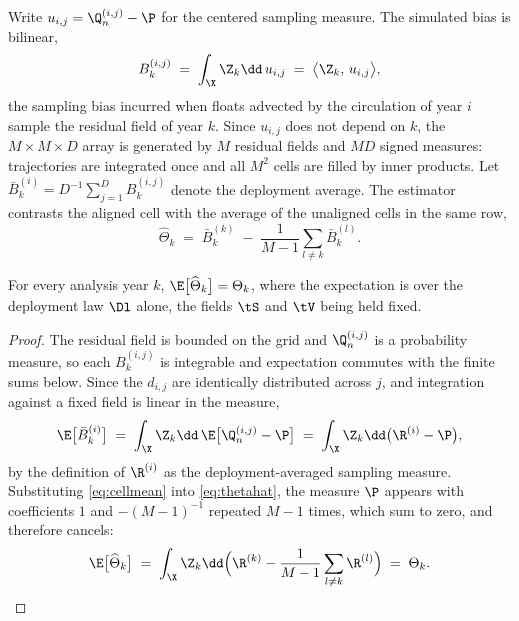 Write $u_{i,j} = \Q_n^{(i,j)} - \P$ for the centered sampling measure. The
simulated bias is bilinear,
\begin{equation}
  \label{eq:Bkl}
  B_k^{(i,j)} \;=\; \int_\X \Z_k \dd\, u_{i,j}
  \;=\; \big\langle \Z_k,\, u_{i,j}\big\rangle ,
\end{equation}
the sampling bias incurred when floats advected by the circulation of year $i$
sample the residual field of year $k$. Since $u_{i,j}$ does not depend on $k$,
the $M \times M \times D$ array is generated by $M$ residual fields and $MD$
signed measures: trajectories are integrated once and all $M^2$ cells are filled
by inner products. Let
$\bar B_k^{(i)} = D^{-1}\sum_{j=1}^{D} B_k^{(i,j)}$ denote the deployment
average. The estimator contrasts the aligned cell with the average of the
unaligned cells in the same row,
\begin{equation}
  \label{eq:thetahat}
  \widehat\Theta_k \;=\; \bar B_k^{(k)} \;-\; \frac{1}{M-1}\sum_{l \neq k} \bar B_k^{(l)} .
\end{equation}

\begin{proposition}[Unbiasedness]
\label{prop:unbiased}
For every analysis year $k$, $\E\big[\widehat\Theta_k\big] = \Theta_k$, where
the expectation is over the deployment law $\Dl$ alone, the fields $\tS$ and
$\tV$ being held fixed.
\end{proposition}

\begin{proof}
The residual field is bounded on the grid and $\Q_n^{(i,j)}$ is a probability
measure, so each $B_k^{(i,j)}$ is integrable and expectation commutes with the
finite sums below. Since the $d_{i,j}$ are identically distributed across $j$,
and integration against a fixed field is linear in the measure,
\begin{equation}
  \label{eq:cellmean}
  \E\big[\bar B_k^{(i)}\big]
  \;=\; \int_\X \Z_k \dd\,\E\big[\Q_n^{(i,j)} - \P\big]
  \;=\; \int_\X \Z_k \dd\big(\R^{(i)} - \P\big) ,
\end{equation}
by the definition of $\R^{(i)}$ as the deployment-averaged sampling measure.
Substituting \eqref{eq:cellmean} into \eqref{eq:thetahat}, the measure $\P$
appears with coefficients $1$ and $-(M-1)^{-1}$ repeated $M-1$ times, which sum
to zero, and therefore cancels:
\begin{equation}
  \E\big[\widehat\Theta_k\big]
  \;=\; \int_\X \Z_k \dd\Big(\R^{(k)} - \frac{1}{M-1}\sum_{l\neq k}\R^{(l)}\Big)
  \;=\; \Theta_k . \qedhere
\end{equation}
\end{proof}

